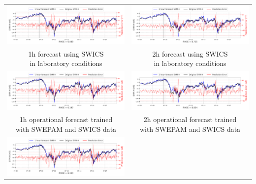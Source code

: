 \documentclass[draft,sw]{agutexSI2019}
\begin{document}
\begin{table}
\centering
\begin{tabular}{cc}
\includegraphics[width=0.49\linewidth]{paper_plots_shade/1h_swics/1h_swics_storm_35.png}
&
\includegraphics[width=0.49\linewidth]{paper_plots_shade/2h_swics/2h_swics_storm_35.png}
\\
\shortstack{1h forecast using SWICS\\ in laboratory conditions} & \shortstack{2h forecast using SWICS\\ in laboratory conditions}
\vspace*{12pt}
\\
\includegraphics[width=0.49\linewidth]{paper_plots_shade/1h_swics_rt/1h_swics_rt_storm_35.png}
&
\includegraphics[width=0.49\linewidth]{paper_plots_shade/2h_swics_rt/2h_swics_rt_storm_35.png}
\\
\shortstack{1h operational forecast trained\\ with SWEPAM and SWICS data} & \shortstack{2h operational forecast trained\\ with SWEPAM and SWICS data}
\vspace*{12pt}
\\
\includegraphics[width=0.49\linewidth]{paper_plots_shade/1h_swepam_rt/1h_swepam_rt_storm_35.png}

\end{tabular}
\end{table}
\end{document}
